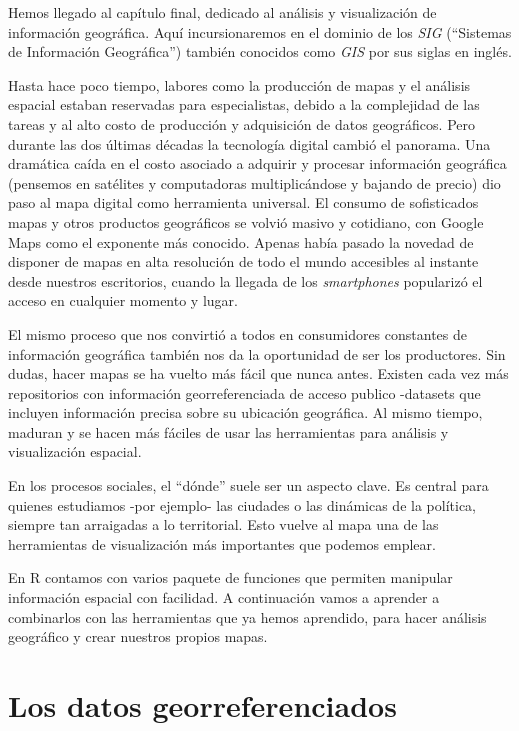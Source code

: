 \documentclass[spanish,]{book}
\begin{document}
Hemos llegado al capítulo final, dedicado al análisis y visualización de información geográfica. Aquí incursionaremos en el dominio de los \emph{SIG} (``Sistemas de Información Geográfica'') también conocidos como \emph{GIS} por sus siglas en inglés.

Hasta hace poco tiempo, labores como la producción de mapas y el análisis espacial estaban reservadas para especialistas, debido a la complejidad de las tareas y al alto costo de producción y adquisición de datos geográficos. Pero durante las dos últimas décadas la tecnología digital cambió el panorama. Una dramática caída en el costo asociado a adquirir y procesar información geográfica (pensemos en satélites y computadoras multiplicándose y bajando de precio) dio paso al mapa digital como herramienta universal. El consumo de sofisticados mapas y otros productos geográficos se volvió masivo y cotidiano, con Google Maps como el exponente más conocido. Apenas había pasado la novedad de disponer de mapas en alta resolución de todo el mundo accesibles al instante desde nuestros escritorios, cuando la llegada de los \emph{smartphones} popularizó el acceso en cualquier momento y lugar.

El mismo proceso que nos convirtió a todos en consumidores constantes de información geográfica también nos da la oportunidad de ser los productores. Sin dudas, hacer mapas se ha vuelto más fácil que nunca antes. Existen cada vez más repositorios con información georreferenciada de acceso publico -datasets que incluyen información precisa sobre su ubicación geográfica. Al mismo tiempo, maduran y se hacen más fáciles de usar las herramientas para análisis y visualización espacial.

En los procesos sociales, el ``dónde'' suele ser un aspecto clave. Es central para quienes estudiamos -por ejemplo- las ciudades o las dinámicas de la política, siempre tan arraigadas a lo territorial. Esto vuelve al mapa una de las herramientas de visualización más importantes que podemos emplear.

En R contamos con varios paquete de funciones que permiten manipular información espacial con facilidad. A continuación vamos a aprender a combinarlos con las herramientas que ya hemos aprendido, para hacer análisis geográfico y crear nuestros propios mapas.

\hypertarget{los-datos-georreferenciados}{%
\section{Los datos georreferenciados}\label{los-datos-georreferenciados}}
\end{document}
